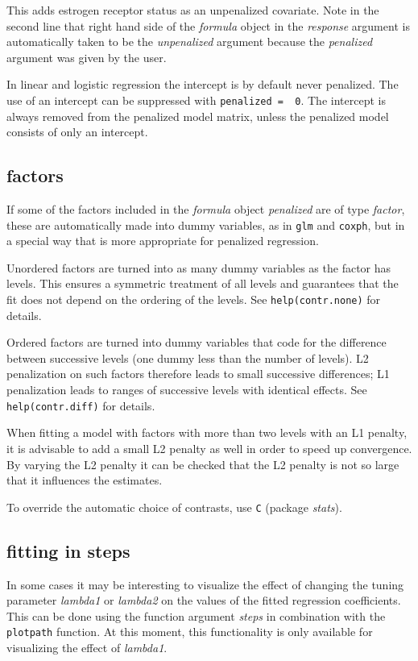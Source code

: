 \documentclass[a4paper]{article}
\newcommand{\Robject}[1]{{\texttt{#1}}}
\newcommand{\Rfunction}[1]{{\texttt{#1}}}
\newcommand{\Rpackage}[1]{{\textit{#1}}}
\newcommand{\Rclass}[1]{{\textit{#1}}}
\newcommand{\Rfunarg}[1]{{\textit{#1}}}
\begin{document}
This adds estrogen receptor status as an unpenalized covariate. Note in the second line that right hand side of the \Rclass{formula} object in the \Rfunarg{response} argument is automatically taken to be the \Rfunarg{unpenalized} argument because the \Rfunarg{penalized} argument was given by the user.

In linear and logistic regression the intercept is by default never penalized. The use of an intercept can be suppressed with \Robject{penalized = ~0}. The intercept is always removed from the penalized model matrix, unless the penalized model consists of only an intercept.


\subsection{factors}

If some of the factors included in the \Rclass{formula} object \Rfunarg{penalized} are of type \Rclass{factor}, these are automatically made into dummy variables, as in \Rfunction{glm} and \Rfunction{coxph}, but in a special way that is more appropriate for penalized regression.

Unordered factors are turned into as many dummy variables as the factor has levels. This ensures a symmetric treatment of all levels and guarantees that the fit does not depend on the ordering of the levels. See \Robject{help(contr.none)} for details.

Ordered factors are turned into dummy variables that code for the difference between successive levels (one dummy less than the number of levels). L2 penalization on such factors therefore leads to small successive differences; L1 penalization leads to ranges of successive levels with identical effects. See \Robject{help(contr.diff)} for details.

When fitting a model with factors with more than two levels with an L1 penalty, it is advisable to add a small L2 penalty as well in order to speed up convergence. By varying the L2 penalty it can be checked that the L2 penalty is not so large that it influences the estimates.

To override the automatic choice of contrasts, use \Rfunction{C} (package \Rpackage{stats}).


\subsection{fitting in steps}

In some cases it may be interesting to visualize the effect of changing the tuning parameter \Rfunarg{lambda1} or \Rfunarg{lambda2} on the values of the fitted regression coefficients. This can be done using the function argument \Rfunarg{steps} in combination with the \Rfunction{plotpath} function. At this moment, this functionality is only available for visualizing the effect of \Rfunarg{lambda1}.
\end{document}
